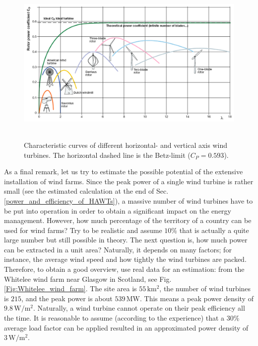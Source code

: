 \begin{figure}[ht!]
	\centering
		\includegraphics[height=8cm]{HydroAndWindPower/Figures/DesignPoint_HAWT_VAWT.png}
	\caption{Characteristic curves of different horizontal- and vertical axis wind turbines. The horizontal dashed line is the Betz-limit ($C_P=0.593$).}
	\label{Fig:DesignPoint_HAWT_VAWT}
\end{figure}

As a final remark, let us try to estimate the possible potential of the extensive installation of wind farms. Since the peak power of a single wind turbine is rather small (see the estimated calculation at the end of Sec.\,\ref{power_and_efficiency_of_HAWTs}), a massive number of wind turbines have to be put into operation in order to obtain a significant impact on the energy management. However, how much percentage of the territory of a country can be used for wind farms? Try to be realistic and assume $10\%$ that is actually a quite large number but still possible in theory. The next question is, how much power can be extracted in a unit area? Naturally, it depends on many factors; for instance, the average wind speed and how tightly the wind turbines are packed. Therefore, to obtain a good overview, use real data for an estimation: from the Whitelee wind farm near Glasgow in Scotland, see Fig.\,\ref{Fig:Whitelee_wind_farm}. The site area is $55\,\mathrm{km^2}$, the number of wind turbines is $215$, and the peak power is about $539\,\mathrm{MW}$. This means a peak power density of $9.8\,\mathrm{W/m^2}$. Naturally, a wind turbine cannot operate on their peak efficiency all the time. It is reasonable to assume (according to the experience) that a $30\%$ average load factor can be applied resulted in an approximated power density of $3\,\mathrm{W/m^2}$.

